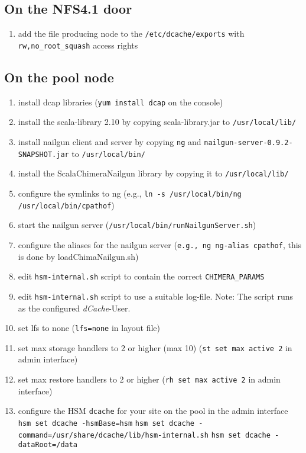 \documentclass[a4paper,8pt]{scrartcl}
\begin{document}
\subsection{On the NFS4.1 door}
\begin{enumerate}
  \item add the file producing node to the \texttt{/etc/dcache/exports} with
    \texttt{rw,no\_root\_squash} access rights
\end{enumerate}

\subsection{On the pool node}
\begin{enumerate}
  \item install dcap libraries (\texttt{yum install dcap} on the console)
  \item install the scala-library 2.10 by copying scala-library.jar to \texttt{/usr/local/lib/}
  \item install nailgun client and server by copying \texttt{ng} and \texttt{nailgun-server-0.9.2-SNAPSHOT.jar} to \texttt{/usr/local/bin/}
  \item install the ScalaChimeraNailgun library by copying it to \texttt{/usr/local/lib/}
  \item configure the symlinks to ng (e.g., \texttt{ln -s /usr/local/bin/ng /usr/local/bin/cpathof})
  \item start the nailgun server (\texttt{/usr/local/bin/runNailgunServer.sh})
  \item configure the aliases for the nailgun server (\texttt{e.g., ng ng-alias cpathof}, this is done by loadChimaNailgun.sh)
  \item edit \texttt{hsm-internal.sh} script to contain the correct \texttt{CHIMERA\_PARAMS}
  \item edit \texttt{hsm-internal.sh} script to use a suitable log-file. Note: The script runs as the configured \emph{dCache}-User.
  \item set lfs to none (\texttt{lfs=none} in layout file)
  \item set max storage handlers to 2 or higher (max 10) (\texttt{st set max active 2} in admin interface)
  \item set max restore handlers to 2 or higher (\texttt{rh set max active 2} in admin interface)
  \item configure the HSM \texttt{dcache} for your site on the pool in the admin interface
     \texttt{hsm set dcache -hsmBase=hsm}
     \texttt{hsm set dcache -command=/usr/share/dcache/lib/hsm-internal.sh}
     \texttt{hsm set dcache -dataRoot=/data}
\end{enumerate}
\end{document}
